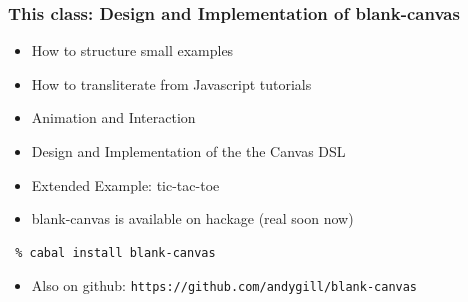 \documentclass{beamer}
\begin{document}
\begin{frame}[fragile]
\frametitle{This class: Design and Implementation of blank-canvas}
\Large
\begin{itemize}
\item How to structure small examples
\item How to transliterate from Javascript tutorials
\item Animation and Interaction
\item Design and Implementation of the the Canvas DSL
\item Extended Example: tic-tac-toe
\frameskip{}
\item blank-canvas is available on hackage (real soon now)
\end{itemize}
\begin{execblock}[0.65]
\begin{verbatim}
 % cabal install blank-canvas
\end{verbatim}
\end{execblock}
\begin{itemize}
\item Also on github: {\tt\small https://github.com/andygill/blank-canvas}
\end{itemize}
\end{frame}
\end{document}
